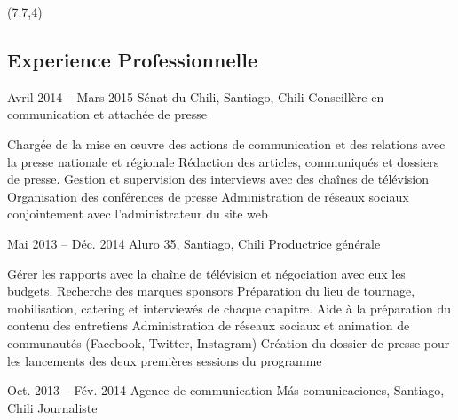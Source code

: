 \documentclass{tccv}
\begin{document}

\begin{textblock}{13}(7.7,4)
\begin{mdframed}
\section{Experience Professionnelle}


\begin{eventlist}
\item{Avril 2014 -- Mars 2015}
     {Sénat du Chili, Santiago, Chili}
     {Conseillère en communication et attachée de presse}

     
    \begin{itemize}
      \setlength\itemsep{0cm} 
      \cvitem[\checkmark] Chargée de la mise en œuvre des actions de communication et des relations avec la presse nationale et régionale
      \cvitem[\checkmark] Rédaction des articles, communiqués et dossiers de presse. Gestion et supervision des interviews avec des chaînes de télévision
      \cvitem[\checkmark] Organisation des conférences de presse
      \cvitem[\checkmark] Administration de réseaux sociaux conjointement avec l’administrateur du site web
    \end{itemize}     
     


\item{Mai 2013 -- Déc. 2014}
     {Aluro 35, Santiago, Chili}
     {Productrice générale}
    
    \begin{itemize}
      \setlength\itemsep{0cm} 
      \cvitem[\checkmark] Gérer les rapports avec la chaîne de télévision et négociation avec eux les budgets. Recherche des marques sponsors
      \cvitem[\checkmark] Préparation du lieu de tournage, mobilisation, catering et interviewés de chaque chapitre. Aide à la préparation du contenu des entretiens
      \cvitem[\checkmark] Administration de réseaux sociaux et animation de communautés (Facebook, Twitter, Instagram)
      \cvitem[\checkmark] Création du dossier de presse pour les lancements des deux premières sessions du programme

    \end{itemize}     

\item{Oct. 2013 -- Fév. 2014 }     
  {Agence de communication Más comunicaciones, Santiago, Chili}     
  {Journaliste}


\end{eventlist}
\end{mdframed}
\end{textblock}
\end{document}
